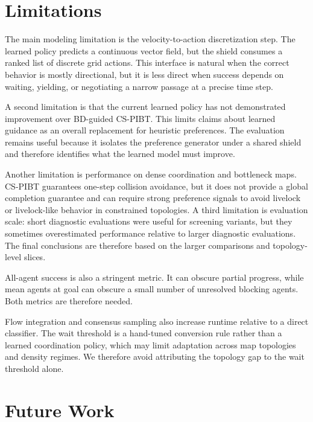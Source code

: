\documentclass[conference]{IEEEtran}
\begin{document}
\section{Limitations}

The main modeling limitation is the velocity-to-action discretization step.
The learned policy predicts a continuous vector field, but the shield consumes a
ranked list of discrete grid actions.  This interface is natural when the
correct behavior is mostly directional, but it is less direct when success
depends on waiting, yielding, or negotiating a narrow passage at a precise
time step.

A second limitation is that the current learned policy has not demonstrated
improvement over BD-guided CS-PIBT.  This limits claims about learned guidance
as an overall replacement for heuristic preferences.  The evaluation remains
useful because it isolates the preference generator under a shared shield and
therefore identifies what the learned model must improve.

Another limitation is performance on dense coordination and bottleneck maps.
CS-PIBT guarantees one-step collision avoidance, but it does not provide a
global completion guarantee and can require strong preference signals to avoid
livelock or livelock-like behavior in constrained topologies.  A third limitation is
evaluation scale: short diagnostic evaluations were useful for screening
variants, but they sometimes overestimated performance relative to larger
diagnostic evaluations.  The final conclusions are therefore based on the larger
comparisons and topology-level slices.

All-agent success is also a stringent metric.  It can obscure partial progress,
while mean agents at goal can obscure a small number of unresolved blocking
agents.  Both metrics are therefore needed.

Flow integration and consensus sampling also increase runtime relative to a
direct classifier.  The wait threshold is a hand-tuned conversion rule rather
than a learned coordination policy, which may limit adaptation across map
topologies and density regimes.  We therefore avoid attributing the topology
gap to the wait threshold alone.

\section{Future Work}
\end{document}
